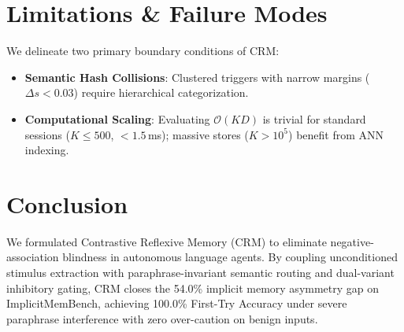 \documentclass[11pt,journal,onecolumn]{IEEEtran}
\begin{document}
\section{Limitations \& Failure Modes}

We delineate two primary boundary conditions of CRM:
\begin{itemize}
\setlength{\itemsep}{0pt}
\setlength{\parskip}{0pt}
    \item \textbf{Semantic Hash Collisions}: Clustered triggers with narrow margins ($\Delta s < 0.03$) require hierarchical categorization.
    \item \textbf{Computational Scaling}: Evaluating $\mathcal{O}(KD)$ is trivial for standard sessions ($K \le 500$, $<1.5$\,ms); massive stores ($K > 10^5$) benefit from ANN indexing.
\end{itemize}

\section{Conclusion}

We formulated Contrastive Reflexive Memory (CRM) to eliminate negative-association blindness in autonomous language agents. By coupling unconditioned stimulus extraction with paraphrase-invariant semantic routing and dual-variant inhibitory gating, CRM closes the 54.0\% implicit memory asymmetry gap on ImplicitMemBench, achieving 100.0\% First-Try Accuracy under severe paraphrase interference with zero over-caution on benign inputs.
\end{document}
